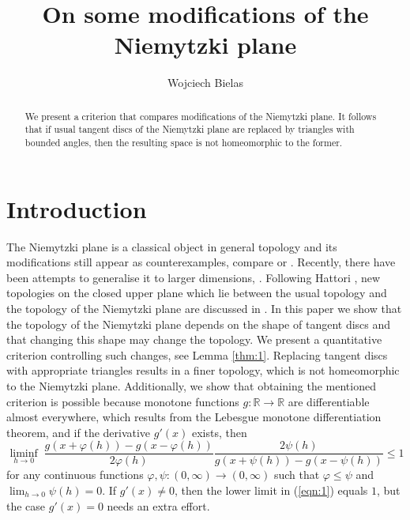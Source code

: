 \documentclass[a4paper,12pt,leqno]{amsart}
\title{On some modifications of the Niemytzki plane}
\author{Wojciech Bielas}
\newcommand{\bbR}{\mathbb{R}}
\renewcommand{\phi}{\varphi}
\theoremstyle{definition}
\renewcommand{\leq}{\leqslant}
\begin{document}
\begin{abstract}
  We present a criterion that compares   modifications of the Niemytzki plane.
  It follows that if usual tangent discs of the Niemytzki plane are replaced by triangles with bounded angles, then the resulting space is not homeomorphic to the former.
\end{abstract}
\maketitle

\section{Introduction}
The Niemytzki plane is a classical object in general topology and its modifications still appear as counterexamples, compare \cite{Engelking} or \cite{Seebach}.
Recently, there have been attempts to generalise it to larger dimensions, \cite{Chatyrko}.
Following Hattori \cite{Hattori}, new topologies on the closed upper plane which lie between the usual topology and the topology of the Niemytzki plane are discussed in \cite{Abuzaid}.
In this paper we  show that  the topology of the Niemytzki plane depends on  the shape of tangent discs and that changing this shape may change the topology.
We present  a quantitative criterion controlling such changes, see Lemma \ref{thm:1}.
Replacing tangent discs with appropriate triangles results in a finer topology, which is not homeomorphic to the Niemytzki plane.
Additionally, we show that obtaining the mentioned criterion is possible because monotone  functions $g\colon \bbR\to\bbR$ are differentiable almost everywhere, which results from the Lebesgue  monotone differentiation theorem, and if the derivative $g'(x)$ exists, then 
\begin{equation}\label{eqn:1}
 \textstyle\underset{h\to 0}{\liminf}\;\frac{g(x+\phi(h))-g(x-\phi(h))}{2\phi(h)} \frac {2\psi(h)}{g(x+\psi(h))-g(x-\psi(h))}\leq 1
 \end{equation}
 for any continuous functions $\phi,\psi\colon (0,\infty)\to(0,\infty)$ such that $\phi\leq\psi$ and $\lim_{h\to 0}\psi(h)=0$.
 If $g'(x)\neq 0$, then the lower limit in (\ref{eqn:1}) equals $1$, but the case $g'(x)=0$ needs an extra effort.
\end{document}
